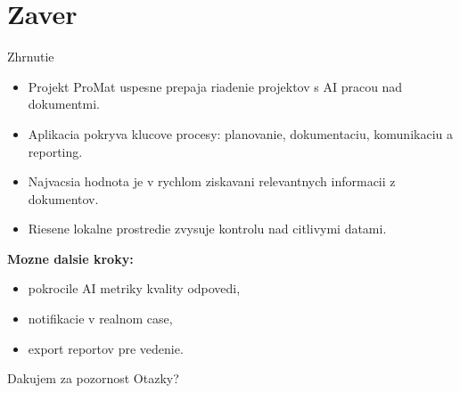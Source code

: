 \documentclass[aspectratio=169]{beamer}
\begin{document}
\section{Zaver}
\begin{frame}{Zhrnutie}
  \begin{itemize}
    \item Projekt ProMat uspesne prepaja riadenie projektov s AI pracou nad dokumentmi.
    \item Aplikacia pokryva klucove procesy: planovanie, dokumentaciu, komunikaciu a reporting.
    \item Najvacsia hodnota je v rychlom ziskavani relevantnych informacii z dokumentov.
    \item Riesene lokalne prostredie zvysuje kontrolu nad citlivymi datami.
  \end{itemize}
  \vspace{0.4cm}
  \textbf{Mozne dalsie kroky:}
  \begin{itemize}
    \item pokrocile AI metriky kvality odpovedi,
    \item notifikacie v realnom case,
    \item export reportov pre vedenie.
  \end{itemize}
\end{frame}

\begin{frame}{Dakujem za pozornost}
  Otazky?
\end{frame}
\end{document}
